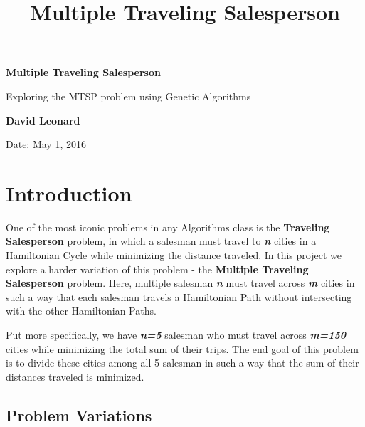 \documentclass{article}
\title{Multiple Traveling Salesperson}
\begin{document}
\nocite{*}


\begin{titlepage}
    \begin{center}
        \vspace*{7.5cm}
        {\bf Multiple Traveling Salesperson}
        
        \vspace{0.5cm}
        
        Exploring the MTSP problem using Genetic Algorithms

        
        \vspace{7.5cm}        
        
        \textbf{David Leonard}
	
	\vspace{0.5cm} 
	Date: May 1, 2016
        
        \vspace{1in}
        \vfill
        
    \end{center}
\end{titlepage}

\tableofcontents

\newpage

\section{Introduction}

One of the most iconic problems in any Algorithms class is the \textbf{Traveling Salesperson} problem, in which a salesman must travel to \textbf{\emph{n}} cities in a Hamiltonian Cycle while minimizing the distance traveled. In this project we explore a harder variation of this problem - the \textbf{Multiple Traveling Salesperson} problem. Here, multiple salesman \textbf{\emph{n}} must travel across \textbf{\emph{m}} cities in such a way that each salesman travels a Hamiltonian Path without intersecting with the other Hamiltonian Paths.

Put more specifically, we have \textbf{\emph{n=5}} salesman who must travel across \textbf{\emph{m=150}} cities while minimizing the total sum of their trips. The end goal of this problem is to divide these cities among all 5 salesman in such a way that the sum of their distances traveled is minimized.

\subsection{Problem Variations}
\end{document}
